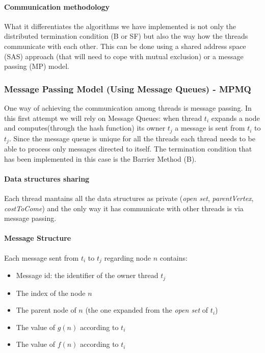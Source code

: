 \documentclass[twocolumn, switch]{article} %
\begin{document}
\paragraph{Communication methodology}
What it differentiates the algorithms we have implemented is not only
the distributed termination condition (B or SF) but also the way how the threads
communicate with each other. This can be done using a shared address space (SAS) approach (that will
need to cope with mutual exclusion) or a message passing (MP) model.
\subsubsection{Message Passing Model (Using Message Queues) - MPMQ}
One way of achieving the communication among threads is message passing. In this first attempt we will rely
on Message Queues: when thread $t_i$ expands a node and computes(through the hash function) 
its owner $t_j$ a message is sent from $t_i$ to $t_j$. Since the message
queue is unique for all the threads each thread needs to be able to process
only messages directed to itself.  The termination condition that has been implemented in this case is the Barrier Method (B).
\paragraph{Data structures sharing}
Each thread mantains all the data structures as private (\textit{open set},
\textit{parentVertex}, \textit{costToCome}) and the only way it has communicate with other threads
is via message passing.
\paragraph{Message Structure} Each message sent from $t_i$ to $t_j$ regarding node $n$ contains:
\begin{itemize}
  \item Message id: the identifier of the owner thread $t_j$
  \item The index of the node $n$
  \item The parent node of $n$ (the one expanded from the \textit{open set} of $t_i$)
  \item The value of $g(n)$ according to $t_i$
  \item The value of $f(n)$ according to $t_i$
\end{itemize}
\end{document}
